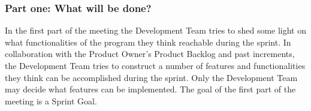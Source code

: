 \subsubsection{Part one: What will be done?}


In the first part of the meeting the Development Team tries to shed some light on what functionalities of the program they think reachable during the sprint\cite{scrumguide11}. In collaboration with the Product Owner's Product Backlog and past increments, the Development Team tries to construct a number of features and functionalities they think can be accomplished during the sprint. Only the Development Team may decide what features can be implemented. The goal of the first part of the meeting is a Sprint Goal\cite{scrumguide11}.